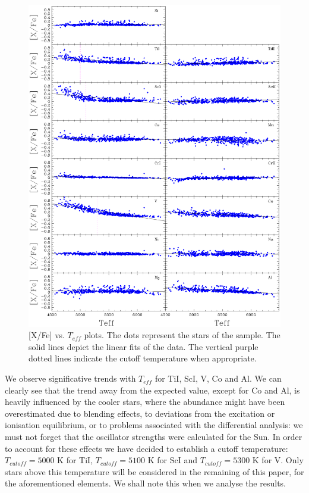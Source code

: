 \documentclass[oldversion]{aa}
\begin{document}
\begin{figure}[t]
\centering
\includegraphics[trim=0cm 1cm 0cm 1cm,clip,width=9 cm]{pics/xfeteffpaperv2.eps}
\caption[depots]{[X/Fe] vs. $T_{eff}$ plots. The dots represent the stars of the sample. The solid lines depict the linear fits of the data. The vertical purple dotted lines indicate the cutoff temperature when appropriate.}
\label{fig:xfeteff}
\end{figure}

We observe significative trends with $T_{eff}$ for TiI, ScI, V, Co and Al. We can clearly see that the trend away from the expected value, except for Co and Al, is heavily influenced by the cooler stars, where the abundance might have been overestimated due to blending effects, to deviations from the excitation or ionisation equilibrium, or to problems associated with the differential analysis: we must not forget that the oscillator strengths were calculated for the Sun. In order to account for these effects we have decided to establish a cutoff temperature: $T_{cutoff}=5000$ K for TiI, $T_{cutoff}=5100$ K for ScI and $T_{cutoff}=5300$ K for V. Only stars above this temperature will be considered in the remaining of this paper, for the aforementioned elements. We shall note this when we analyse the results. %

\end{document}
